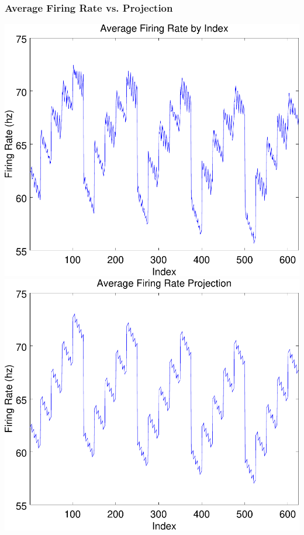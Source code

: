 \documentclass{beamer}
\theoremstyle{plain}
\theoremstyle{definition}
\begin{document}
\begin{frame}\frametitle{Average Firing Rate vs. Projection}
  \begin{center}
    \includegraphics[scale=.32]{AverageFiringRate.pdf}%
    \includegraphics[scale=.32]{AverageFiringRateProjection.pdf}
  \end{center}
\end{frame}

\end{document}
